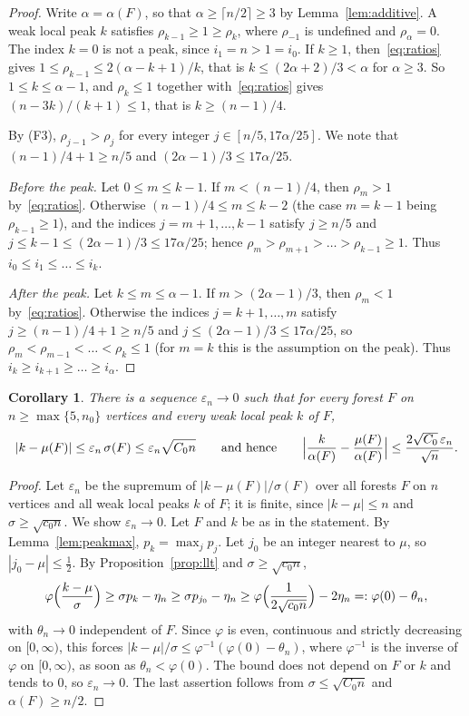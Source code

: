 \documentclass{amsart}
\numberwithin{equation}{section}
\theoremstyle{plain}
\newtheorem{corollary}[theorem]{Corollary}
\theoremstyle{definition}
\theoremstyle{remark}
\newcommand{\eps}{\varepsilon}
\begin{document}
\begin{proof}
Write $\alpha=\alpha(F)$, so that $\alpha\ge\lceil n/2\rceil\ge3$ by Lemma~\ref{lem:additive}. A weak local peak $k$ satisfies $\rho_{k-1}\ge1\ge\rho_k$, where $\rho_{-1}$ is undefined and $\rho_\alpha=0$. The index $k=0$ is not a peak, since $i_1=n>1=i_0$. If $k\ge1$, then~\eqref{eq:ratios} gives $1\le\rho_{k-1}\le2(\alpha-k+1)/k$, that is $k\le(2\alpha+2)/3<\alpha$ for $\alpha\ge3$. So $1\le k\le\alpha-1$, and $\rho_k\le1$ together with~\eqref{eq:ratios} gives $(n-3k)/(k+1)\le1$, that is $k\ge(n-1)/4$.

By (F3), $\rho_{j-1}>\rho_j$ for every integer $j\in[n/5,17\alpha/25]$. We note that $(n-1)/4+1\ge n/5$ and $(2\alpha-1)/3\le17\alpha/25$.

\emph{Before the peak.} Let $0\le m\le k-1$. If $m<(n-1)/4$, then $\rho_m>1$ by~\eqref{eq:ratios}. Otherwise $(n-1)/4\le m\le k-2$ (the case $m=k-1$ being $\rho_{k-1}\ge1$), and the indices $j=m+1,\dots,k-1$ satisfy $j\ge n/5$ and $j\le k-1\le(2\alpha-1)/3\le17\alpha/25$; hence $\rho_m>\rho_{m+1}>\dots>\rho_{k-1}\ge1$. Thus $i_0\le i_1\le\dots\le i_k$.

\emph{After the peak.} Let $k\le m\le\alpha-1$. If $m>(2\alpha-1)/3$, then $\rho_m<1$ by~\eqref{eq:ratios}. Otherwise the indices $j=k+1,\dots,m$ satisfy $j\ge(n-1)/4+1\ge n/5$ and $j\le(2\alpha-1)/3\le17\alpha/25$, so $\rho_m<\rho_{m-1}<\dots<\rho_k\le1$ (for $m=k$ this is the assumption on the peak). Thus $i_k\ge i_{k+1}\ge\dots\ge i_\alpha$.
\end{proof}

\begin{corollary}\label{cor:peaks}
There is a sequence $\eps_n\to0$ such that for every forest $F$ on $n\ge\max\{5,n_0\}$ vertices and every weak local peak $k$ of $F$,
\[
|k-\mu(F)|\le\eps_n\,\sigma(F)\le\eps_n\sqrt{C_0n}\qquad\text{and hence}\qquad\Bigl|\frac{k}{\alpha(F)}-\frac{\mu(F)}{\alpha(F)}\Bigr|\le\frac{2\sqrt{C_0}\,\eps_n}{\sqrt n}.
\]
\end{corollary}

\begin{proof}
Let $\eps_n$ be the supremum of $|k-\mu(F)|/\sigma(F)$ over all forests $F$ on $n$ vertices and all weak local peaks $k$ of $F$; it is finite, since $|k-\mu|\le n$ and $\sigma\ge\sqrt{c_0n}$. We show $\eps_n\to0$. Let $F$ and $k$ be as in the statement. By Lemma~\ref{lem:peakmax}, $p_k=\max_jp_j$. Let $j_0$ be an integer nearest to $\mu$, so $|j_0-\mu|\le\frac12$. By Proposition~\ref{prop:llt} and $\sigma\ge\sqrt{c_0n}$,
\[
\varphi\Bigl(\frac{k-\mu}{\sigma}\Bigr)\ge\sigma p_k-\eta_n\ge\sigma p_{j_0}-\eta_n\ge\varphi\Bigl(\frac{1}{2\sqrt{c_0n}}\Bigr)-2\eta_n=:\varphi(0)-\theta_n,
\]
with $\theta_n\to0$ independent of $F$. Since $\varphi$ is even, continuous and strictly decreasing on $[0,\infty)$, this forces $|k-\mu|/\sigma\le\varphi^{-1}(\varphi(0)-\theta_n)$, where $\varphi^{-1}$ is the inverse of $\varphi$ on $[0,\infty)$, as soon as $\theta_n<\varphi(0)$. The bound does not depend on $F$ or $k$ and tends to $0$, so $\eps_n\to0$. The last assertion follows from $\sigma\le\sqrt{C_0n}$ and $\alpha(F)\ge n/2$.
\end{proof}
\end{document}
